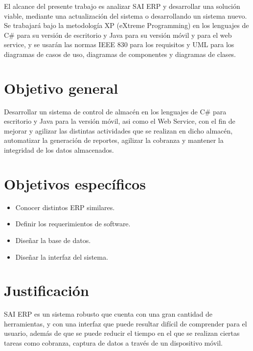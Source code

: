 El alcance del presente trabajo es analizar SAI ERP y desarrollar una solución viable, mediante una actualización del sistema o desarrollando un sistema nuevo. Se trabajará bajo la metodología XP (eXtreme Programming) en los lenguajes de C\# para su versión de escritorio y Java para su versión móvil y para el web service, y se usarán las normas IEEE 830 para los requisitos y UML para los diagramas de casos de uso, diagramas de componentes y diagramas de clases.

\section{Objetivo general}
Desarrollar un sistema de control de almacén en los lenguajes de C\# para escritorio y Java para la versión móvil, asi como el Web Service, con el fin de mejorar y agilizar las distintas actividades que se realizan en dicho almacén, automatizar la generación de reportes, agilizar la cobranza y mantener la integridad de los datos almacenados.

\section{Objetivos específicos}
\begin{itemize}
\item Conocer distintos ERP similares.
\item Definir los requerimientos de software.
\item Diseñar la base de datos.
\item Diseñar la interfaz del sistema.
\end{itemize}

\section{Justificación}
SAI ERP es un sistema robusto que cuenta con una gran cantidad de herramientas, y con una interfaz que puede resultar difícil de comprender para el usuario, además de que se puede reducir el tiempo en el que se realizan ciertas tareas como cobranza, captura de datos a través de un dispositivo móvil.